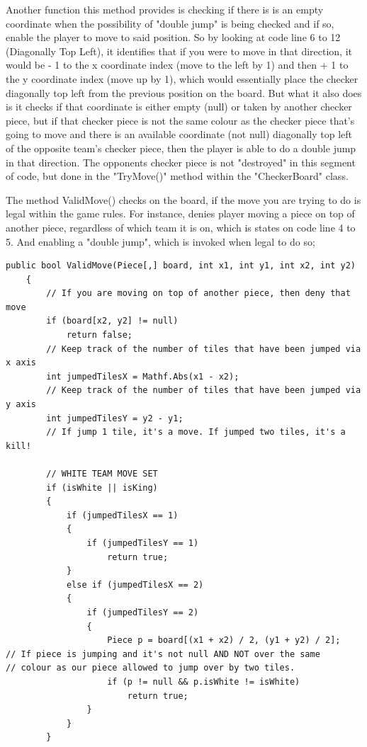 \documentclass[10pt, a4paper]{article}
\begin{document}
	Another function this method provides is checking if there is is an empty coordinate when the possibility of "double jump" is being checked and if so, enable the player to move to said position. So by looking at code line 6 to 12 (Diagonally Top Left), it identifies that if you were to move in that direction, it would be - 1 to the x coordinate index (move to the left by 1) and then + 1 to the y coordinate index (move up by 1), which would essentially place the checker diagonally top left from the previous position on the board. But what it also does is it checks if that coordinate is either empty (null) or taken by another checker piece, but if that checker piece is not the same colour as the checker piece that's going to move and there is an available coordinate (not null) diagonally top left of the opposite team's checker piece, then the player is able to do a double jump in that direction. The opponents checker piece is not "destroyed" in this segment of code, but done in the "TryMove()" method within the "CheckerBoard" class.
	
	The method ValidMove() checks on the board, if the move you are trying to do is legal within the game rules. For instance, denies player moving a piece on top of another piece, regardless of which team it is on, which is states on code line 4 to 5. And enabling a "double jump", which is invoked when legal to do so;
	
	\begin{lstlisting}[caption = ValidMove()]
	 public bool ValidMove(Piece[,] board, int x1, int y1, int x2, int y2)
    {
        // If you are moving on top of another piece, then deny that move
        if (board[x2, y2] != null)
            return false;
        // Keep track of the number of tiles that have been jumped via x axis
        int jumpedTilesX = Mathf.Abs(x1 - x2);
        // Keep track of the number of tiles that have been jumped via y axis
        int jumpedTilesY = y2 - y1;
        // If jump 1 tile, it's a move. If jumped two tiles, it's a kill!
        
        // WHITE TEAM MOVE SET
        if (isWhite || isKing)
        {
            if (jumpedTilesX == 1)
            {
                if (jumpedTilesY == 1)
                    return true;
            }
            else if (jumpedTilesX == 2)
            {
                if (jumpedTilesY == 2)
                {
                    Piece p = board[(x1 + x2) / 2, (y1 + y2) / 2];
// If piece is jumping and it's not null AND NOT over the same
// colour as our piece allowed to jump over by two tiles.
                    if (p != null && p.isWhite != isWhite)
                        return true;
                }
            }
        }
	\end{lstlisting}
	
\end{document}

